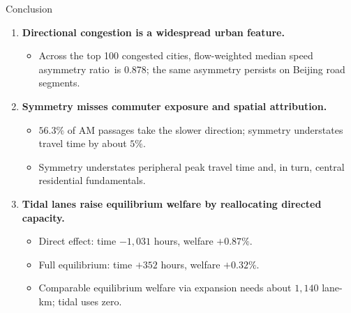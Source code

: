 \documentclass[11pt,aspectratio=169]{beamer}
\newcommand{\good}[1]{\textcolor{blue!70!black}{#1}}
\newcommand{\SAR}{speed asymmetry ratio}
\begin{document}
\begin{frame}{Conclusion}
\begin{enumerate}\small\setlength\itemsep{1.05em}
  \item \textbf{Directional congestion is a widespread urban feature.}
  \begin{itemize}\footnotesize\setlength\itemsep{0.45em}
    \item Across the top 100 congested cities, flow-weighted median \SAR\ is \good{0.878}; the same asymmetry persists on Beijing road segments.
  \end{itemize}
  \item \textbf{Symmetry misses commuter exposure and spatial attribution.}
  \begin{itemize}\footnotesize\setlength\itemsep{0.45em}
    \item \good{$56.3\%$} of AM passages take the slower direction; symmetry understates travel time by \good{about $5\%$}.
    \item Symmetry understates peripheral peak travel time and, in turn, central residential fundamentals.
  \end{itemize}
  \item \textbf{Tidal lanes raise equilibrium welfare by reallocating directed capacity.}
  \begin{itemize}\footnotesize\setlength\itemsep{0.45em}
    \item Direct effect: time \good{$-1{,}031$} hours, welfare \good{$+0.87\%$}.
    \item Full equilibrium: time $+352$ hours, welfare \good{$+0.32\%$}.
    \item Comparable equilibrium welfare via expansion needs about $1{,}140$ lane-km; tidal uses \good{zero}.
  \end{itemize}
\end{enumerate}
\end{frame}
\end{document}
